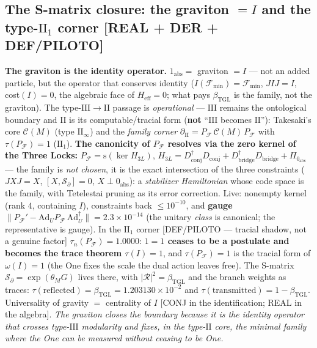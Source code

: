 \documentclass[11pt]{article}
\newcommand{\bTGL}{\beta_{\mathrm{TGL}}}\newcommand{\Msun}{M_{\odot}}\newcommand{\TGL}{\mathrm{TGL}}
\theoremstyle{definition}\newtheorem{deriv}{Derivation}
\begin{document}
\subsection*{The S-matrix closure: the graviton $=I$ and the type-$\mathrm{II}_1$ corner \textsf{[REAL + DER + DEF/PILOTO]}}

\textbf{The graviton is the identity operator.} $1_{\mathrm{abs}}=$ graviton $=I$ --- not an added particle, but the operator that conserves identity ($I(\mathcal F_{\min})=\mathcal F_{\min}$, $JIJ=I$, cost$(I)=0$, the algebraic face of $H_{\mathrm{eff}}=0$; what pays $\bTGL$ is the family, not the graviton). The type-$\mathrm{III}\to\mathrm{II}$ passage is \emph{operational} --- $\mathrm{III}$ remains the ontological boundary and $\mathrm{II}$ is its computable/tracial form (\textbf{not} ``$\mathrm{III}$ becomes $\mathrm{II}$''): Takesaki's core $\mathcal C(M)$ (type $\mathrm{II}_\infty$) and the \emph{family corner} $\partial_{\mathrm{II}}=P_{\mathcal F}\,\mathcal C(M)\,P_{\mathcal F}$ with $\tau(P_{\mathcal F})=1$ ($\mathrm{II}_1$). \textbf{The canonicity of $P_{\mathcal F}$ resolves via the zero kernel of the Three Locks:} $P_{\mathcal F}=\mathrm{s}(\ker H_{3L})$, $H_{3L}=D_{\mathrm{conj}}^{\dagger}D_{\mathrm{conj}}+D_{\mathrm{bridge}}^{\dagger}D_{\mathrm{bridge}}+\Pi_{0_{\mathrm{abs}}}$ --- the family is \emph{not chosen}, it is the exact intersection of the three constraints ($JXJ=X$, $[X,\mathcal S_\partial]=0$, $X\perp 0_{\mathrm{abs}}$): a \emph{stabilizer Hamiltonian} whose code space is the family, with Tetelestai pruning as its error correction. Live: nonempty kernel (rank $4$, containing $I$), constraints back $\le10^{-10}$, and \textbf{gauge} $\|P_{\mathcal F}'-\mathrm{Ad}_U P_{\mathcal F}\,\mathrm{Ad}_U^{\dagger}\|=2.3\times10^{-14}$ (the unitary \emph{class} is canonical; the representative is gauge). In the $\mathrm{II}_1$ corner \textsf{[DEF/PILOTO --- tracial shadow, not a genuine factor]} $\tau_n(P_{\mathcal F})=1.0000$: \textbf{$1=1$ ceases to be a postulate and becomes the trace theorem $\tau(I)=1$}, and $\tau(P_{\mathcal F})=1$ is the tracial form of $\omega(I)=1$ (the One fixes the scale the dual action leaves free). The S-matrix $\mathcal S_\partial=\exp(\theta_M G)$ lives there, with $|\mathcal R|^2=\bTGL$ and the branch weights as traces: $\tau(\text{reflected})=\bTGL=1.203130\times10^{-2}$ and $\tau(\text{transmitted})=1-\bTGL$. Universality of gravity $=$ centrality of $I$ \textsf{[CONJ in the identification; REAL in the algebra]}. \emph{The graviton closes the boundary because it is the identity operator that crosses type-$\mathrm{III}$ modularity and fixes, in the type-$\mathrm{II}$ core, the minimal family where the One can be measured without ceasing to be One.}
\end{document}
